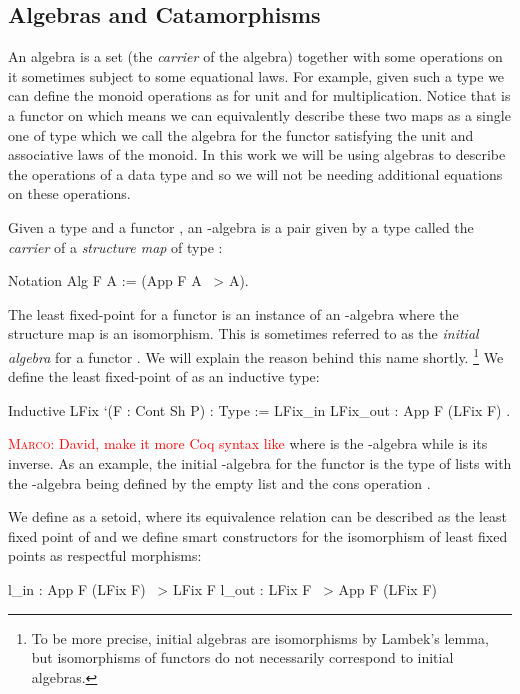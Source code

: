 \documentclass[ a4paper, UKenglish, cleveref, autoref, thm-restate]{lipics-v2021}
\newcommand{\mpav}[1]{\textcolor{red}{\textsc{Marco}: #1}}
\begin{document}
\subsection{Algebras and Catamorphisms}
\label{sec:algebras} An algebra is a set  (the
\emph{carrier} of the algebra) together with some operations on it sometimes
subject to some equational laws. For example, given such a type  we can
define the monoid operations as  for unit
and  for multiplication. Notice
that  is a functor on  which means we can
equivalently describe these two maps as a single one of type 
which we call the algebra for the functor  satisfying the unit and
associative laws of the monoid. In this work we will be using algebras to
describe the operations of a data type and so we will not be needing additional
equations on these operations.

Given a type  and a functor , an -algebra is a pair given
by a type  called the \emph{carrier} of a \emph{structure map} of
type :
\begin{coqcode}
Notation Alg F A := (App F A ~> A).
\end{coqcode}
The least fixed-point for a functor  is an instance of an -algebra
where the structure map is an isomorphism. This is sometimes referred to as the
\emph{initial algebra} for a functor . We will explain the reason behind this name shortly. \footnote[1]{To be more precise,
initial algebras are isomorphisms by Lambek's lemma, but isomorphisms of
functors do not necessarily correspond to initial algebras.}  We define the
least fixed-point of  as an inductive type:
\begin{coqcode}
Inductive LFix `(F : Cont Sh P) : Type := LFix_in { LFix_out : App F (LFix F) }.
\end{coqcode}
\mpav{David, make it more Coq syntax like}
where  is the -algebra while  is its inverse.
As an example, the initial -algebra for the
functor  is the type of lists with the -algebra
being defined by the empty list  and the cons
operation .

We define  as a setoid, where its equivalence relation can be
described as the least fixed point of  and we define smart
constructors for the isomorphism of least fixed points as respectful morphisms:
\begin{coqcode}
l_in : App F (LFix F) ~> LFix F                l_out : LFix F ~> App F (LFix F)
\end{coqcode}
\end{document}
